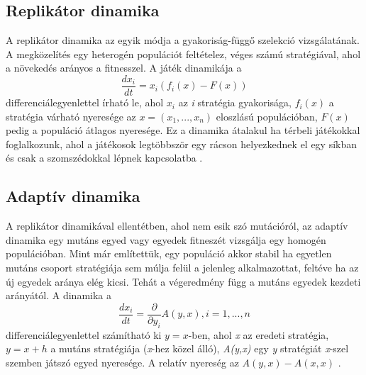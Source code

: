 \subsection{Replikátor dinamika}
A replikátor dinamika az egyik módja a gyakoriság-függő szelekció vizsgálatának. A megközelítés egy heterogén populációt feltételez, véges számú stratégiával, ahol a növekedés arányos a fitnesszel. A játék dinamikája a 
\begin{equation}
\frac{dx_i}{dt} = x_i(f_i(x) - F(x))
\end{equation}
differenciálegyenlettel írható le, ahol \(x_i\) az \textit{i} stratégia gyakorisága, \(f_i(x)\) a stratégia várható nyeresége az \(x = (x_1,...,x_n)\) eloszlású populációban, \(F(x)\) pedig a populáció átlagos nyeresége.
Ez a dinamika átalakul ha térbeli játékokkal foglalkozunk, ahol a játékosok legtöbbször egy rácson helyezkednek el egy síkban és csak a szomszédokkal lépnek kapcsolatba \cite{hummert2014evolutionary}. 

\subsection{Adaptív dinamika}
A replikátor dinamikával ellentétben, ahol nem esik szó mutációról, az adaptív dinamika egy mutáns egyed vagy egyedek fitneszét vizsgálja egy homogén populációban. Mint már említettük, egy populáció akkor stabil ha egyetlen mutáns csoport stratégiája sem múlja felül a jelenleg alkalmazottat, feltéve ha az új egyedek aránya elég kicsi. Tehát a végeredmény függ a mutáns egyedek kezdeti arányától. A dinamika a 
\begin{equation}
\frac{dx_i}{dt} = \frac{\partial}{\partial y_i}A(y,x), i = 1,...,n
\end{equation}
differenciálegyenlettel számítható ki \(y = x\)-ben, ahol \textit{x} az eredeti stratégia, \(y = x + h\) a mutáns stratégiája (\textit{x}-hez közel álló), \textit{A(y,x)} egy \textit{y} stratégiát \textit{x}-szel szemben játszó egyed nyeresége. A relatív nyereség az \(A(y,x) - A(x,x)\) \cite{hummert2014evolutionary}.
